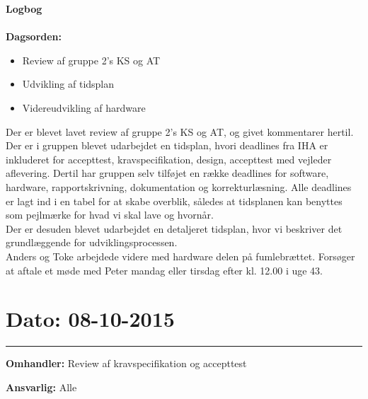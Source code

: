 \textbf{Logbog}
\\
\\
\textbf{Dagsorden:}
\begin{itemize}
	\item Review af gruppe 2's KS og AT
	\item Udvikling af tidsplan
	\item Videreudvikling af hardware
\end{itemize}

Der er blevet lavet review af gruppe 2's KS og AT, og givet kommentarer hertil. \\
Der er i gruppen blevet udarbejdet en tidsplan, hvori deadlines fra IHA er inkluderet for accepttest, kravspecifikation, design, accepttest med vejleder aflevering. Dertil har gruppen selv tilføjet en række deadlines for software, hardware, rapportskrivning, dokumentation og korrekturlæsning. Alle deadlines er lagt ind i en tabel for at skabe overblik, således at tidsplanen kan benyttes som pejlmærke for hvad vi skal lave og hvornår.\\
Der er desuden blevet udarbejdet en detaljeret tidsplan, hvor vi beskriver det grundlæggende for udviklingsprocessen.\\
Anders og Toke arbejdede videre med hardware delen på fumlebrættet.
Forsøger at aftale et møde med Peter mandag eller tirsdag efter kl. 12.00 i uge 43.

	
	

\section{Dato: 08-10-2015 }
\hrule

\textbf{Omhandler:} Review af kravspecifikation og accepttest 

\textbf{Ansvarlig:} Alle

